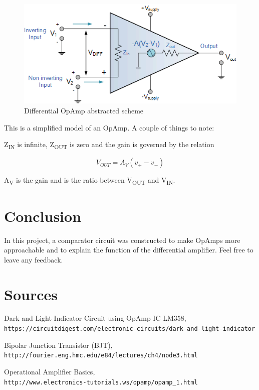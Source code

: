 \documentclass{article}
\begin{document}
	\begin{figure}[H]
		\centering
		\includegraphics[scale=0.75]{OAAbs}
		\caption{Differential OpAmp abstracted scheme\cite{diff}}
	\end{figure}

	This is a simplified model of an OpAmp. A couple of things to note:

	Z\textsubscript{IN} is infinite, Z\textsubscript{OUT} is zero and the gain is governed by the relation

	\[V_{OUT} = A_V(v_+ - v_-) \]

	A\textsubscript{V} is the gain and is the ratio between V\textsubscript{OUT} and V\textsubscript{IN}.

	\section{Conclusion}
	In this project, a comparator circuit was constructed
	to make OpAmps more approachable and to explain the function of the
	differential amplifier. Feel free to leave any feedback.

	\section{Sources}

	\begin{thebibliography}{3}

	Dark and Light Indicator Circuit using OpAmp IC LM358,
	\\\texttt{https://circuitdigest.com/electronic-circuits/dark-and-light-indicator}

	Bipolar Junction Transistor (BJT),
	\\\texttt{http://fourier.eng.hmc.edu/e84/lectures/ch4/node3.html}

	Operational Amplifier Basics,
	\\\texttt{http://www.electronics-tutorials.ws/opamp/opamp\_1.html}

	

	\end{thebibliography}
\end{document}
